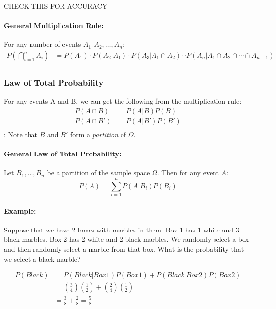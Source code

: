 CHECK THIS FOR ACCURACY
\paragraph*{General Multiplication Rule:} For any number of events $A_1, A_2, \ldots, A_n$:
\begin{align*}
    P\left(\bigcap_{i=1}^{n} A_i\right) &= P(A_1) \cdot P(A_2|A_1) \cdot P(A_3|A_1 \cap A_2) \cdots P(A_n|A_1 \cap A_2 \cap \cdots \cap A_{n-1}) \\
\end{align*}

\subsubsection*{Law of Total Probability}
For any events A and B, we can get the following from the multiplication rule:
\begin{align*}
    P(A \cap B) &= P(A|B)P(B) \\
    P(A \cap B') &= P(A|B')P(B') \\
\end{align*}:
Note that $B$ and $B'$ form a \textit{partition} of $\Omega$.

\paragraph*{General Law of Total Probability:}
Let $B_1, \ldots, B_n$ be a partition of the sample space $\Omega$. Then for any event $A$:
\[
    P(A) = \sum_{i=1}^{n} P(A|B_i)P(B_i)
\]

\paragraph*{Example:}
Suppose that we have 2 boxes with marbles in them. Box 1 has 1 white and 3 black marbles. Box 2 
has 2 white and 2 black marbles. We randomly select a box and then randomly select a marble from that box.
What is the probability that we select a black marble?

\begin{align*}
    P(Black) &= P(Black|Box 1)P(Box 1) + P(Black|Box 2)P(Box 2) \\
    &= \left(\frac{3}{4}\right)\left(\frac{1}{2}\right) + \left(\frac{2}{4}\right)\left(\frac{1}{2}\right) \\
    &= \frac{3}{8} + \frac{2}{8} = \frac{5}{8} \\
\end{align*}


